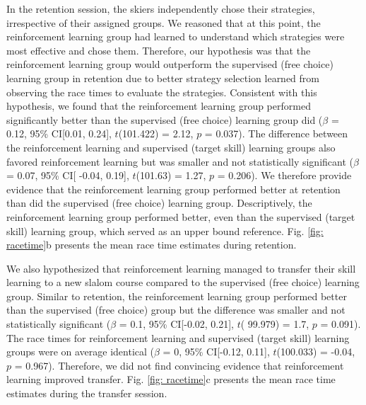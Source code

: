 In the retention session, the skiers independently chose their strategies, irrespective of their assigned groups. We reasoned that at this point, the reinforcement learning group had learned to understand which strategies were most effective and chose them. Therefore, our hypothesis was that the reinforcement learning group would outperform the supervised (free choice) learning group in retention due to better strategy selection learned from observing the race times to evaluate the strategies. Consistent with this hypothesis, we found that the reinforcement learning group performed significantly better than the supervised (free choice) learning group did ($\beta$ = 0.12, 95\% CI[0.01, 0.24], $t$(101.422) = 2.12, $p$ = 0.037). The difference between the reinforcement learning and supervised (target skill) learning groups also favored reinforcement learning but was smaller and not statistically significant  ($\beta$ = 0.07, 95\% CI[ -0.04, 0.19], $t$(101.63) = 1.27, $p$ = 0.206). We therefore provide evidence that the reinforcement learning group performed better at retention than did the supervised (free choice) learning group. Descriptively, the reinforcement learning group performed better, even than the supervised (target skill) learning group, which served as an upper bound reference. Fig. \ref{fig: racetime}b presents the mean race time estimates during retention. 

We also hypothesized that reinforcement learning managed to transfer their skill learning to a new slalom course compared to the supervised (free choice) learning group. Similar to retention, the reinforcement learning group performed better than the supervised (free choice) group but the difference was smaller and not statistically significant ($\beta$ = 0.1, 95\% CI[-0.02, 0.21], $t$( 99.979) = 1.7, $p$  = 0.091). The race times for reinforcement learning and supervised (target skill) learning groups were on average identical ($\beta$ = 0, 95\% CI[-0.12, 0.11], $t$(100.033) = -0.04, $p$ = 0.967). Therefore, we did not find convincing evidence that reinforcement learning improved transfer. Fig. \ref{fig: racetime}c presents the mean race time estimates during the transfer session. 

